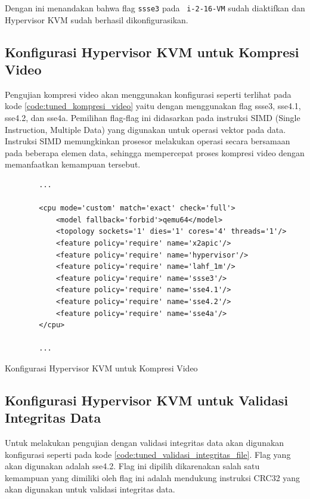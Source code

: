 Dengan ini menandakan bahwa flag \texttt{ssse3} pada \vm\ \texttt{i-2-16-VM} sudah diaktifkan dan Hypervisor KVM sudah berhasil dikonfigurasikan.

\subsection{Konfigurasi Hypervisor KVM untuk Kompresi Video}
Pengujian kompresi video akan menggunakan konfigurasi seperti terlihat pada kode \ref{code:tuned_kompresi_video} yaitu dengan menggunakan flag ssse3, sse4.1, sse4.2, dan sse4a. Pemilihan flag-flag ini didasarkan pada instruksi SIMD (Single Instruction, Multiple Data) yang digunakan untuk operasi vektor pada data. Instruksi SIMD memungkinkan prosesor melakukan operasi secara bersamaan pada beberapa elemen data, sehingga mempercepat proses kompresi video dengan memanfaatkan kemampuan tersebut.

\begin{listing}[H]
    \begin{verbatim}
        ...

        <cpu mode='custom' match='exact' check='full'>
            <model fallback='forbid'>qemu64</model>
            <topology sockets='1' dies='1' cores='4' threads='1'/>
            <feature policy='require' name='x2apic'/>
            <feature policy='require' name='hypervisor'/> 
            <feature policy='require' name='lahf_1m'/>
            <feature policy='require' name='ssse3'/>
            <feature policy='require' name='sse4.1'/>
            <feature policy='require' name='sse4.2'/>
            <feature policy='require' name='sse4a'/>
        </cpu>
        
        ...
    \end{verbatim}
    \caption{Konfigurasi Hypervisor KVM untuk Kompresi Video}
    \label{code:tuned_kompresi_video}
\end{listing}

\subsection{Konfigurasi Hypervisor KVM untuk Validasi Integritas Data}
Untuk melakukan pengujian dengan validasi integritas data akan digunakan konfigurasi seperti pada kode \ref{code:tuned_validasi_integritas_file}. Flag yang akan digunakan adalah sse4.2. Flag ini dipilih dikarenakan salah satu kemampuan yang dimiliki oleh flag ini adalah mendukung instruksi CRC32 yang akan digunakan untuk validasi integritas data.

